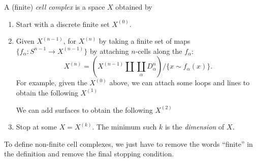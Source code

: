 \documentclass[a4paper]{article}
\begin{document}
\begin{defi}
  A (finite) \emph{cell complex} is a space $X$ obtained by
  \begin{enumerate}
    \item Start with a discrete finite set $X^{(0)}$.
      \begin{center}
      \end{center}
    \item Given $X^{(n - 1)}$, for $X^{(n)}$ by taking a finite set of maps $\{f_\alpha: S^{n - 1} \to X^{(n - 1)}\}$ by attaching $n$-cells along the $f_\alpha$:
      \[
        X^{(n)} = \left(X^{(n - 1)}\amalg \coprod_\alpha D_{\alpha}^n\right)/\{x\sim f_\alpha(x)\}.
      \]
      For example, given the $X^{(0)}$ above, we can attach some loops and lines to obtain the following $X^{(1)}$
      \begin{center}
      \end{center}
      We can add surfaces to obtain the following $X^{(2)}$
      \begin{center}
      \end{center}
    \item Stop at some $X = X^{(k)}$. The minimum such $k$ is the \emph{dimension} of $X$.
  \end{enumerate}
  To define non-finite cell complexes, we just have to remove the words ``finite'' in the definition and remove the final stopping condition.
\end{defi}
\end{document}
